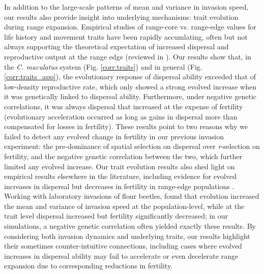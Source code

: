 \documentclass[11pt]{article}
\begin{document}
In addition to the large-scale patterns of mean and variance in invasion speed, our results also provide insight into underlying mechanisms: trait evolution during range expansion.
Empirical studies of range-core vs. range-edge values for life history and movement traits have been rapidly accumlating, often but not always supporting the theoretical expectation of increased dispersal and reproductive output at the range edge (reviewed in \citealt{chuang_expanding_2016}).
Our results show that, in the \textit{C. maculatus} system (Fig. \ref{corr:traits}) and in general (Fig. \ref{corr:traits_app}), the evolutionary response of dispersal ability exceeded that of low-density reproductive rate, which only showed a strong evolved increase when it was genetically linked to dispersal ability.
Furthermore, under negative genetic correlations, it was always dispersal that increased at the expense of fertility (evolutionary acceleration occurred as long as gains in dispersal more than compensated for losses in fertility).
These results point to two reasons why we failed to detect any evolved change in fertility in our previous invasion experiment: the pre-dominance of spatial selection on dispersal over \textit{r}-selection on fertility, and the negative genetic correlation between the two, which further limited any evolved increase.
Our trait evolution results also shed light on empirical results elsewhere in the literature, including evidence for evolved increases in dispersal but decreases in fertility in range-edge populations \citep{simmons_changes_2004,hughes_evolutionary_2003}.
Working with laboratory invasions of flour beetles, \cite{weiss-lehman_rapid_2017} found that evolution increased the mean and variance of invasion speed at the population-level, while at the trait level dispersal increased but fertility significantly decreased; in our simulations, a negative genetic correlation often yielded exactly these results.
By considering both invasion dynamics and underlying traits, our results highlight their sometimes counter-intuitive connections, including cases where evolved increases in dispersal ability may fail to accelerate or even decelerate range expansion due to corresponding reductions in fertility.
\end{document}
